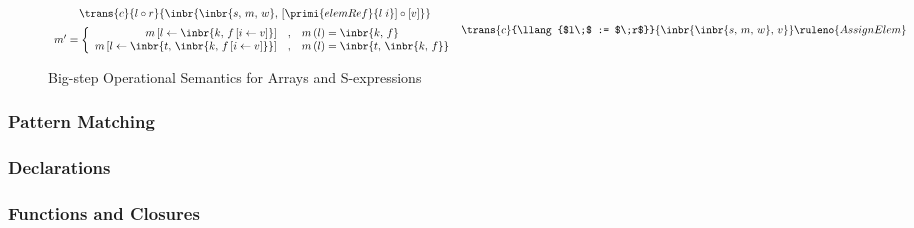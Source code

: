 \begin{figure}
\[{         \begin{array}{c}
           \trans{c}{l\circ r}{\inbr{\inbr{s,\,m,\,w},\,[\primi{elemRef}{l\;i}]\circ[v]}}\\[2mm]
           m^\prime=\left\{\begin{array}{rcl}
                            m\,[l\gets\inbr{k,\,f\,[i\gets v]}] &,&m\,(l)=\inbr{k,\,f}\\
                            m\,[l\gets\inbr{t,\,\inbr{k,\,f\,[i\gets v]}}] &,&m\,(l)=\inbr{t,\,\inbr{k,\,f}}
                          \end{array}
                   \right. 
         \end{array}
        }
        {\trans{c}{\llang{$l\;$ := $\;r$}}{\inbr{\inbr{s,\,m,\,w},\,v}}}\ruleno{AssignElem}
  \]    
\caption{Big-step Operational Semantics for Arrays and S-expressions}  
\label{semantics:arrays}
\end{figure}

\subsubsection{Pattern Matching}

\subsubsection{Declarations}

\subsubsection{Functions and Closures}

